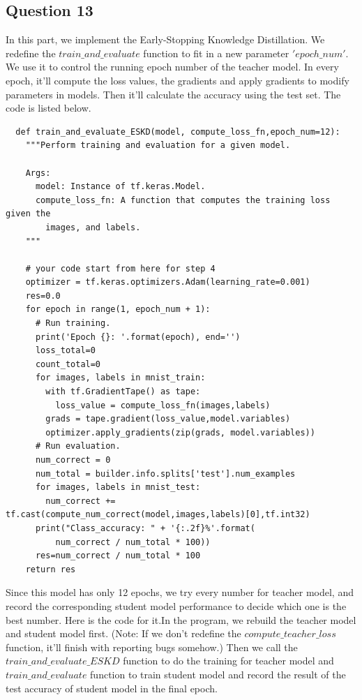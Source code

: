 \documentclass[conference]{IEEEtran}
\begin{document}
  \subsection{Question 13}
  In this part, we implement the Early-Stopping Knowledge Distillation.
  We redefine the $train\_and\_evaluate$ function to fit in a new parameter $'epoch\_num'$. We use it to control the running epoch number of the teacher model.
  In every epoch, it'll compute the loss values, the gradients and apply gradients to modify parameters in models. Then it'll calculate the accuracy using the test set.
  The code is listed below. 
  \begin{lstlisting}
  def train_and_evaluate_ESKD(model, compute_loss_fn,epoch_num=12):
    """Perform training and evaluation for a given model.
  
    Args:
      model: Instance of tf.keras.Model.
      compute_loss_fn: A function that computes the training loss given the
        images, and labels.
    """
  
    # your code start from here for step 4
    optimizer = tf.keras.optimizers.Adam(learning_rate=0.001)
    res=0.0
    for epoch in range(1, epoch_num + 1):
      # Run training.
      print('Epoch {}: '.format(epoch), end='')
      loss_total=0
      count_total=0
      for images, labels in mnist_train:
        with tf.GradientTape() as tape:
          loss_value = compute_loss_fn(images,labels)
        grads = tape.gradient(loss_value,model.variables)
        optimizer.apply_gradients(zip(grads, model.variables))
      # Run evaluation.
      num_correct = 0
      num_total = builder.info.splits['test'].num_examples
      for images, labels in mnist_test:
        num_correct += tf.cast(compute_num_correct(model,images,labels)[0],tf.int32)
      print("Class_accuracy: " + '{:.2f}%'.format(
          num_correct / num_total * 100))
      res=num_correct / num_total * 100
    return res
  \end{lstlisting}\par
  Since this model has only 12 epochs, we try every number for teacher model, and record the corresponding student model performance to decide which one is the best number. 
  Here is the code for it.In the program, we rebuild the teacher model and student model first. (Note: If we don't redefine the $compute\_teacher\_loss$ function, it'll finish with reporting bugs somehow.)
  Then we call the $train\_and\_evaluate\_ESKD$ function to do the training for teacher model and  $train\_and\_evaluate$ function to train student model and record the result of the test accuracy of student model in the final epoch.
\end{document}
